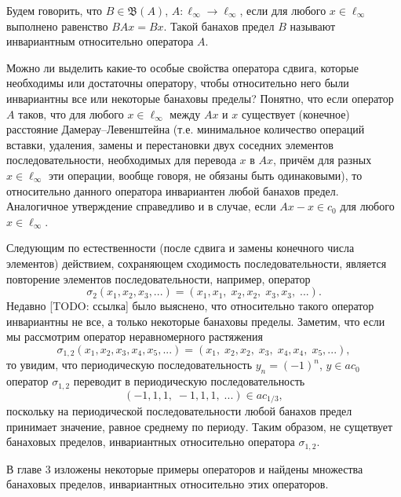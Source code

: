 Будем говорить, что $B\in\mathfrak B(A)$, $A : \ell_\infty\to \ell_\infty$, если для любого $x\in \ell_\infty$
выполнено равенство $BAx = Bx$.
Такой банахов предел $B$ называют инвариантным относительно оператора $A$.

Можно ли выделить какие-то особые свойства оператора сдвига,
которые необходимы или достаточны оператору, чтобы относительно него были инвариантны все или некоторые банаховы пределы?
Понятно, что если оператор $A$ таков, что для любого $x\in\ell_\infty$ между $Ax$ и $x$
существует (конечное) расстояние Дамерау--Левенштейна \cite{damerau1964technique} (т.е. минимальное количество операций вставки, удаления, замены и перестановки двух соседних элементов последовательности, необходимых для перевода $x$ в $Ax$, причём для разных $x\in\ell_\infty$ эти операции, вообще говоря, не обязаны быть одинаковыми), то относительно данного оператора инвариантен любой банахов предел. Аналогичное утверждение справедливо и в случае, если $Ax -x \in c_0$ для любого $x\in \ell_\infty$.

Следующим по естественности (после сдвига и замены конечного числа элементов) действием, сохраняющем сходимость последовательности, является повторение элементов последовательности, например, оператор
\begin{equation}
	\sigma_2(x_1,x_2,x_3,...) = (x_1,x_1, \; x_2, x_2, \; x_3, x_3, \; ...)
	.
\end{equation}
Недавно [TODO: ссылка] было выяснено, что относительно такого оператор инвариантны не все, а только некоторые банаховы пределы.
Заметим, что если мы рассмотрим оператор неравномерного растяжения
\begin{equation}
	\sigma_{1,2}(x_1,x_2,x_3,x_4,x_5,...) = (x_1, \; x_2, x_2, \;  x_3, \; x_4, x_4, \; x_5, ...)
	,
\end{equation}
то увидим, что периодическую последовательность $y_n = (-1)^n$, $y\in ac_0$ оператор $\sigma_{1,2}$
переводит в периодическую последовательность
\begin{equation}
	(-1, 1, 1, \; -1, 1, 1, \; ...) \in ac_{1/3}
	,
\end{equation}
поскольку на периодической последовательности любой банахов предел принимает значение, равное среднему по периоду.
Таким образом, не сущетвует банаховых пределов, инвариантных относительно оператора $\sigma_{1,2}$.

В главе 3 изложены некоторые примеры операторов и найдены множества банаховых пределов,
инвариантных относительно этих операторов.


